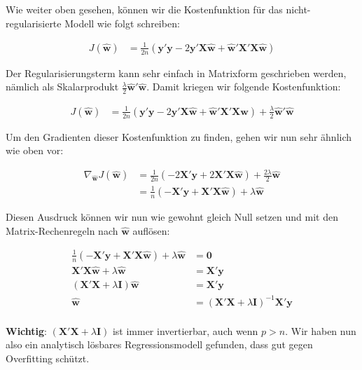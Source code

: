 \documentclass[
]{book}
\begin{document}
Wie weiter oben gesehen, können wir die Kostenfunktion für das nicht-regularisierte Modell wie folgt schreiben:

\begin{align}
J(\mathbf{\hat{w}}) &= \frac{1}{2n} (\mathbf{y}'\mathbf{y} - 2\mathbf{y}'\mathbf{X}\mathbf{\hat{w}} + \mathbf{\hat{w}}' \mathbf{X}'\mathbf{X}\mathbf{\hat{w}})
\end{align}

Der Regularisierungsterm kann sehr einfach in Matrixform geschrieben werden, nämlich als Skalarprodukt \(\frac{\lambda}{2}\mathbf{\hat{w}}'\mathbf{\hat{w}}\). Damit kriegen wir folgende Kostenfunktion:

\begin{align}
J(\mathbf{\hat{w}}) &= \frac{1}{2n} (\mathbf{y}'\mathbf{y} - 2\mathbf{y}'\mathbf{X}\mathbf{\hat{w}} + \mathbf{\hat{w}}' \mathbf{X}'\mathbf{X}\mathbf{\hat{w}}) + \frac{\lambda}{2}\mathbf{\hat{w}}'\mathbf{\hat{w}}
\end{align}

Um den Gradienten dieser Kostenfunktion zu finden, gehen wir nun sehr ähnlich wie oben vor:

\begin{align}
\nabla_{\mathbf{\hat{w}}} J(\mathbf{\hat{w}}) &= \frac{1}{2n} (- 2\mathbf{X}'\mathbf{y} + 2\mathbf{X}'\mathbf{X}\mathbf{\hat{w}}) + \frac{2\lambda}{2}\mathbf{\hat{w}} \\
&= \frac{1}{n} (-\mathbf{X}'\mathbf{y} + \mathbf{X}'\mathbf{X}\mathbf{\hat{w}}) + \lambda \mathbf{\hat{w}}
\end{align}

Diesen Ausdruck können wir nun wie gewohnt gleich Null setzen und mit den Matrix-Rechenregeln nach \(\mathbf{\hat{w}}\) auflösen:

\begin{align}
\frac{1}{n} (-\mathbf{X}'\mathbf{y} + \mathbf{X}'\mathbf{X}\mathbf{\hat{w}}) + \lambda \mathbf{\hat{w}} &= \mathbf{0} \\
\mathbf{X}'\mathbf{X}\mathbf{\hat{w}} + \lambda \mathbf{\hat{w}} &= \mathbf{X}'\mathbf{y} \\
(\mathbf{X}'\mathbf{X} + \lambda \mathbf{I}) \mathbf{\hat{w}} &= \mathbf{X}'\mathbf{y} \\
\mathbf{\hat{w}} &= (\mathbf{X}'\mathbf{X} + \lambda \mathbf{I})^{-1}\mathbf{X}'\mathbf{y} \\
\end{align}

\textbf{Wichtig}: \((\mathbf{X}'\mathbf{X} + \lambda \mathbf{I})\) ist immer invertierbar, auch wenn \(p>n\). Wir haben nun also ein analytisch lösbares Regressionsmodell gefunden, dass gut gegen Overfitting schützt.
\end{document}
